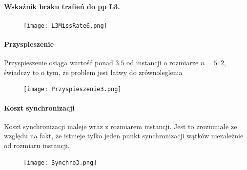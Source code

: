 \documentclass{scrartcl}
\begin{document}
\paragraph{Wskaźnik braku trafień do pp L3.} 
\begin{figure}[H]
\texttt{[image: L3MissRate6.png]}
\end{figure}

\paragraph{Przyspieszenie} Przyspieszenie osiąga wartość ponad $3.5$ od instancji o rozmiarze $n = 512$, świadczy to o tym, że problem jest łatwy do zrównoleglenia
\begin{figure}[H]
\texttt{[image: Przyspieszenie3.png]}
\end{figure}

\paragraph{Koszt synchronizacji} Koszt synchronizacji maleje wraz z rozmiarem instancji. Jest to zrozumiałe ze względu na fakt, że istnieje tylko jeden punkt synchronizacji wątków niezależnie od rozmiaru instancji.
\begin{figure}[H]
\texttt{[image: Synchro3.png]}
\end{figure}
\end{document}

